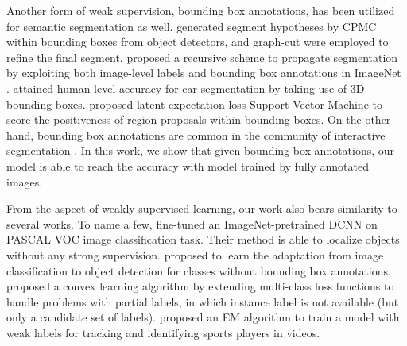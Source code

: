 Another form of weak supervision, bounding box annotations, has been utilized for semantic segmentation as well. \citet{xia2013semantic} generated segment hypotheses by CPMC \citep{carreira2012cpmc} within bounding boxes from object detectors, and graph-cut were employed to refine the final segment. \citet{guillaumin2014imagenet} proposed a recursive scheme to propagate segmentation by exploiting both image-level labels and bounding box annotations in ImageNet \citep{deng2009imagenet}. \citet{chen2014beat} attained human-level accuracy for car segmentation by taking use of 3D bounding boxes. \citet{zhu2014learning} proposed latent expectation loss Support Vector Machine to score the positiveness of region proposals within bounding boxes. On the other hand, bounding box annotations are common in the community of interactive segmentation \citep{lempitsky2009image, rother2004grabcut, WuMilcut}. In this work, we show that given bounding box annotations, our model is able to reach the accuracy with model trained by fully annotated images.

From the aspect of weakly supervised learning, our work also bears similarity to several works. To name a few, \citet{oquab2014weakly} fine-tuned an ImageNet-pretrained DCNN on PASCAL VOC image classification task. Their method is able to localize objects without any strong supervision. \citet{Hoffman14Lsda} proposed to learn the adaptation from image classification to object detection for classes without bounding box annotations. \citet{cour2011learning} proposed a convex learning algorithm by extending multi-class loss functions to handle problems with partial labels, in which instance label is not available (but only a candidate set of labels). \citet{Lu2013sports} proposed an EM algorithm to train a model with weak labels for tracking and identifying sports players in videos.
